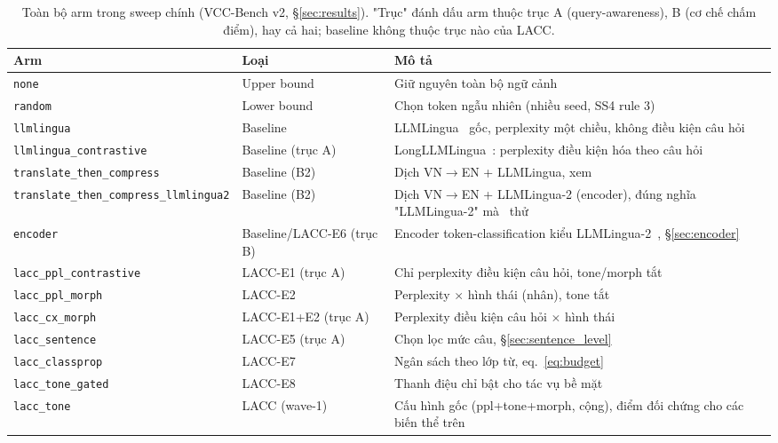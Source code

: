\documentclass[12pt,a4paper]{article}
\newcommand{\method}[1]{\textsc{#1}}         %
\begin{document}
\begin{table}[H]
\centering
\caption{Toàn bộ arm trong sweep chính (VCC-Bench v2, \S\ref{sec:results}). "Trục" đánh dấu arm thuộc trục A (query-awareness), B (cơ chế chấm điểm), hay cả hai; baseline không thuộc trục nào của \method{LACC}.}
\label{tab:baselines}
\begin{tabular}{llp{6.3cm}}
\toprule
\textbf{Arm} & \textbf{Loại} & \textbf{Mô tả} \\
\midrule
\texttt{none} & Upper bound & Giữ nguyên toàn bộ ngữ cảnh \\
\texttt{random} & Lower bound & Chọn token ngẫu nhiên (nhiều seed, SS4 rule 3) \\
\texttt{llmlingua} & Baseline & LLMLingua~\cite{jiang2023llmlingua} gốc, perplexity một chiều, không điều kiện câu hỏi \\
\texttt{llmlingua\_contrastive} & Baseline (trục A) & LongLLMLingua~\cite{jiang2023longllmlingua}: perplexity điều kiện hóa theo câu hỏi \\
\texttt{translate\_then\_compress} & Baseline (B2) & Dịch VN$\to$EN + LLMLingua, xem \cite{lukauskas2026lost} \\
\texttt{translate\_then\_compress\_llmlingua2} & Baseline (B2) & Dịch VN$\to$EN + LLMLingua-2 (encoder), đúng nghĩa "LLMLingua-2" mà~\cite{lukauskas2026lost} thử \\
\texttt{encoder} & Baseline/\method{LACC}-E6 (trục B) & Encoder token-classification kiểu LLMLingua-2~\cite{pan2024llmlingua2}, \S\ref{sec:encoder} \\
\texttt{lacc\_ppl\_contrastive} & \method{LACC}-E1 (trục A) & Chỉ perplexity điều kiện câu hỏi, tone/morph tắt \\
\texttt{lacc\_ppl\_morph} & \method{LACC}-E2 & Perplexity $\times$ hình thái (nhân), tone tắt \\
\texttt{lacc\_cx\_morph} & \method{LACC}-E1+E2 (trục A) & Perplexity điều kiện câu hỏi $\times$ hình thái \\
\texttt{lacc\_sentence} & \method{LACC}-E5 (trục A) & Chọn lọc mức câu, \S\ref{sec:sentence_level} \\
\texttt{lacc\_classprop} & \method{LACC}-E7 & Ngân sách theo lớp từ, eq.~\eqref{eq:budget} \\
\texttt{lacc\_tone\_gated} & \method{LACC}-E8 & Thanh điệu chỉ bật cho tác vụ bề mặt \\
\texttt{lacc\_tone} & \method{LACC} (wave-1) & Cấu hình gốc (ppl+tone+morph, cộng), điểm đối chứng cho các biến thể trên \\
\bottomrule
\end{tabular}
\end{table}
\end{document}
